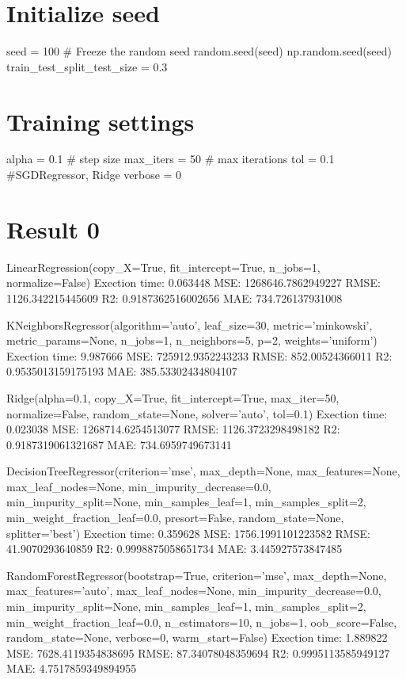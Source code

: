 \documentclass[11pt]{article}
\begin{document}
    \section{Initialize seed}\label{initialize-seed}

seed = 100 \# Freeze the random seed random.seed(seed)
np.random.seed(seed) train\_test\_split\_test\_size = 0.3

\section{Training settings}\label{training-settings}

alpha = 0.1 \# step size max\_iters = 50 \# max iterations tol = 0.1
\#SGDRegressor, Ridge verbose = 0

\section{Result 0}\label{result-0}

LinearRegression(copy\_X=True, fit\_intercept=True, n\_jobs=1,
normalize=False) Exection time: 0.063448 MSE: 1268646.7862949227 RMSE:
1126.342215445609 R2: 0.9187362516002656 MAE: 734.726137931008

KNeighborsRegressor(algorithm='auto', leaf\_size=30, metric='minkowski',
metric\_params=None, n\_jobs=1, n\_neighbors=5, p=2, weights='uniform')
Exection time: 9.987666 MSE: 725912.9352243233 RMSE: 852.00524366011 R2:
0.9535013159175193 MAE: 385.53302434804107

Ridge(alpha=0.1, copy\_X=True, fit\_intercept=True, max\_iter=50,
normalize=False, random\_state=None, solver='auto', tol=0.1) Exection
time: 0.023038 MSE: 1268714.6254513077 RMSE: 1126.3723298498182 R2:
0.9187319061321687 MAE: 734.6959749673141

DecisionTreeRegressor(criterion='mse', max\_depth=None,
max\_features=None, max\_leaf\_nodes=None, min\_impurity\_decrease=0.0,
min\_impurity\_split=None, min\_samples\_leaf=1, min\_samples\_split=2,
min\_weight\_fraction\_leaf=0.0, presort=False, random\_state=None,
splitter='best') Exection time: 0.359628 MSE: 1756.1991101223582 RMSE:
41.9070293640859 R2: 0.9998875058651734 MAE: 3.445927573847485

RandomForestRegressor(bootstrap=True, criterion='mse', max\_depth=None,
max\_features='auto', max\_leaf\_nodes=None,
min\_impurity\_decrease=0.0, min\_impurity\_split=None,
min\_samples\_leaf=1, min\_samples\_split=2,
min\_weight\_fraction\_leaf=0.0, n\_estimators=10, n\_jobs=1,
oob\_score=False, random\_state=None, verbose=0, warm\_start=False)
Exection time: 1.889822 MSE: 7628.4119354838695 RMSE: 87.34078048359694
R2: 0.9995113585949127 MAE: 4.7517859349894955
\end{document}
